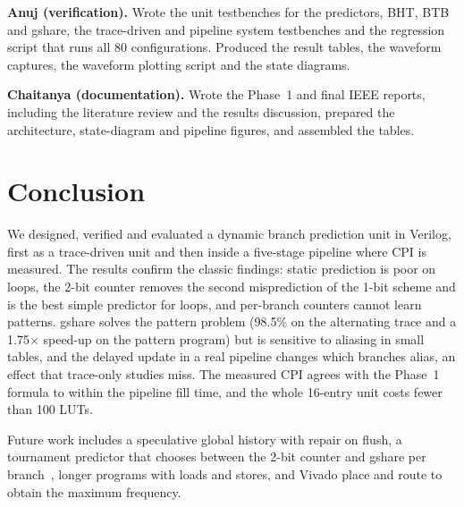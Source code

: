 \documentclass[conference]{IEEEtran}
\begin{document}
\textbf{Anuj (verification).} Wrote the unit testbenches for the predictors, BHT, BTB and gshare,
the trace-driven and pipeline system testbenches and the regression script that runs all 80
configurations. Produced the result tables, the waveform captures, the waveform plotting script
and the state diagrams.

\textbf{Chaitanya (documentation).} Wrote the Phase~1 and final IEEE reports, including the
literature review and the results discussion, prepared the architecture, state-diagram and
pipeline figures, and assembled the tables.

\section{Conclusion}
We designed, verified and evaluated a dynamic branch prediction unit in Verilog, first as a
trace-driven unit and then inside a five-stage pipeline where CPI is measured. The results
confirm the classic findings: static prediction is poor on loops, the 2-bit counter removes the
second misprediction of the 1-bit scheme and is the best simple predictor for loops, and
per-branch counters cannot learn patterns. gshare solves the pattern problem (98.5\% on the
alternating trace and a 1.75$\times$ speed-up on the pattern program) but is sensitive to aliasing
in small tables, and the delayed update in a real pipeline changes which branches alias, an
effect that trace-only studies miss. The measured CPI agrees with the Phase~1 formula to within
the pipeline fill time, and the whole 16-entry unit costs fewer than 100 LUTs.

Future work includes a speculative global history with repair on flush, a tournament predictor
that chooses between the 2-bit counter and gshare per branch~\cite{mcfarling1993}, longer
programs with loads and stores, and Vivado place and route to obtain the maximum frequency.

\balance


\end{document}
